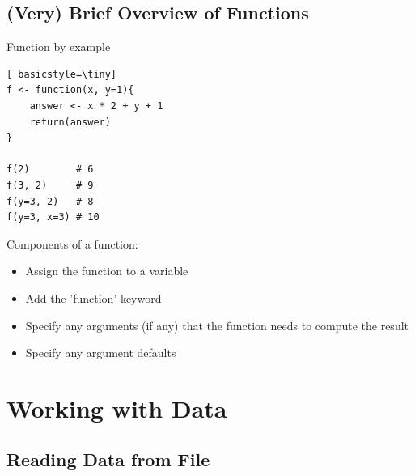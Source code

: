 \subsection{(Very) Brief Overview of Functions}
\begin{frame}[fragile]
	\begin{center}
		\begin{block}{Function by example}
			\begin{lstlisting}[ basicstyle=\tiny]
f <- function(x, y=1){
	answer <- x * 2 + y + 1
	return(answer)
}

f(2)        # 6
f(3, 2)     # 9
f(y=3, 2)   # 8
f(y=3, x=3) # 10
			\end{lstlisting}	
		\end{block}

		\begin{block}{Components of a function:}
			\begin{itemize}
				\item Assign the function to a variable
				\item Add the 'function' keyword
				\item Specify any arguments (if any) that the function needs to compute the result
				\item Specify any argument defaults
			\end{itemize}
		\end{block}
	\end{center} 
\end{frame}


\section{Working with Data}

\subsection{Reading Data from File}

